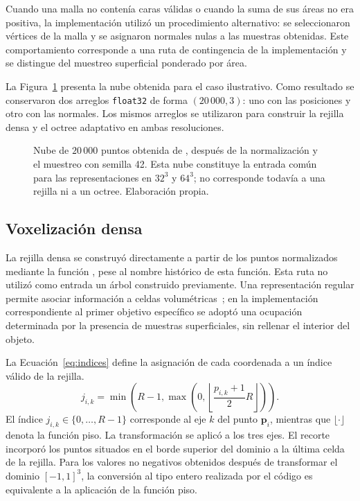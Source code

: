 Cuando una malla no contenía caras válidas o cuando la suma de sus áreas no era positiva, la implementación utilizó un procedimiento alternativo: se seleccionaron vértices de la malla y se asignaron normales nulas a las muestras obtenidas. Este comportamiento corresponde a una ruta de contingencia de la implementación y se distingue del muestreo superficial ponderado por área.

La Figura~\ref{fig:nube} presenta la nube obtenida para el caso ilustrativo. Como resultado se conservaron dos arreglos \texttt{float32} de forma $(20\,000,3)$: uno con las posiciones y otro con las normales. Los mismos arreglos se utilizaron para construir la rejilla densa y el octree adaptativo en ambas resoluciones.
\begin{figure}[H]
\centering
{}
\caption{Nube de $20\,000$ puntos obtenida de \protect{}, después de la normalización y el muestreo con semilla 42. Esta nube constituye la entrada común para las representaciones en $32^3$ y $64^3$; no corresponde todavía a una rejilla ni a un octree. Elaboración propia.}
\label{fig:nube}
\end{figure}

\subsection{Voxelización densa}
\label{subsec:voxelizacion-densa}

La rejilla densa se construyó directamente a partir de los puntos normalizados mediante la función \protect{}, pese al nombre histórico de esta función. Esta ruta no utilizó como entrada un árbol construido previamente. Una representación regular permite asociar información a celdas volumétricas~\parencite{wu2015}; en la implementación correspondiente al primer objetivo específico se adoptó una ocupación determinada por la presencia de muestras superficiales, sin rellenar el interior del objeto.

La Ecuación~\eqref{eq:indices} define la asignación de cada coordenada a un índice válido de la rejilla.
\begin{equation}
j_{i,k}=
\min\left(
R-1,
\max\left(
0,
\left\lfloor
\frac{p_{i,k}+1}{2}R
\right\rfloor
\right)
\right).
\label{eq:indices}
\end{equation}
El índice $j_{i,k}\in\{0,\ldots,R-1\}$ corresponde al eje $k$ del punto $\mathbf p_i$, mientras que $\lfloor\cdot\rfloor$ denota la función piso. La transformación se aplicó a los tres ejes. El recorte incorporó los puntos situados en el borde superior del dominio a la última celda de la rejilla. Para los valores no negativos obtenidos después de transformar el dominio $[-1,1]^3$, la conversión al tipo entero realizada por el código es equivalente a la aplicación de la función piso.

